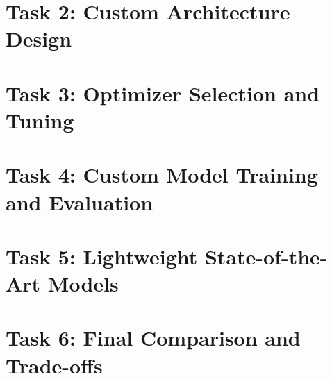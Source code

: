 \documentclass[11pt]{article}
\begin{document}

\clearpage
\section{Task 2: Custom Architecture Design}
\label{sec:task2}


\clearpage
\section{Task 3: Optimizer Selection and Tuning}
\label{sec:task3}


\section{Task 4: Custom Model Training and Evaluation}
\label{sec:task4}


\section{Task 5: Lightweight State-of-the-Art Models}
\label{sec:task5}


\clearpage
\section{Task 6: Final Comparison and Trade-offs}
\label{sec:task6}
\end{document}

